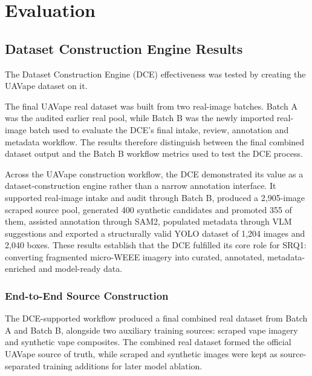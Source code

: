 \section{Evaluation}
\subsection{Dataset Construction Engine Results}

The Dataset Construction Engine (DCE) effectiveness was tested by creating the UAVape dataset on it.

The final UAVape real dataset was built from two real-image batches. Batch A was the audited earlier real pool, while Batch B was the newly imported real-image batch used to evaluate the DCE's final intake, review, annotation and metadata workflow. The results therefore distinguish between the final combined dataset output and the Batch B workflow metrics used to test the DCE process.

Across the UAVape construction workflow, the DCE demonstrated its value as a dataset-construction engine rather than a narrow annotation interface. It supported real-image intake and audit through Batch B, produced a 2,905-image scraped source pool, generated 400 synthetic candidates and promoted 355 of them, assisted annotation through SAM2, populated metadata through VLM suggestions and exported a structurally valid YOLO dataset of 1,204 images and 2,040 boxes. These results establish that the DCE fulfilled its core role for SRQ1: converting fragmented micro-WEEE imagery into curated, annotated, metadata-enriched and model-ready data.


\subsubsection{End-to-End Source Construction}

The DCE-supported workflow produced a final combined real dataset from Batch A and Batch B, alongside two auxiliary training sources: scraped vape imagery and synthetic vape composites. The combined real dataset formed the official UAVape source of truth, while scraped and synthetic images were kept as source-separated training additions for later model ablation.

